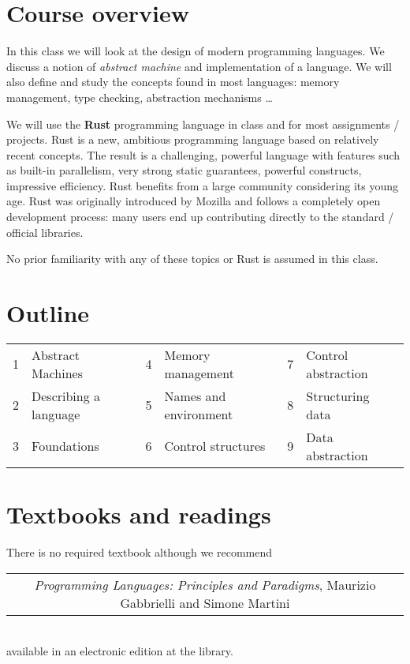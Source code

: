 \documentclass[10pt]{article}
\newcommand{\ita}[1]{\textit{#1}}
\begin{document}
\section*{Course overview}

In this class we will look at the design of modern programming languages. We
discuss a notion of \ita{abstract machine} and implementation of a language.
We will also define and study the concepts found in most languages: memory
management, type checking, abstraction mechanisms \ldots

We will use the \textbf{Rust} programming language in class and for most
assignments / projects. Rust is a new, ambitious programming language based on
relatively recent concepts. The result is a challenging, powerful language with
features such as built-in parallelism, very strong static guarantees, powerful
constructs, impressive efficiency. Rust benefits from a large community
considering its young age. Rust was originally introduced by Mozilla and
follows a completely open development process: many users end up contributing
directly to the standard / official libraries.\newline

No prior familiarity with any of these topics or Rust is assumed in this class.


\section*{Outline}

\begin{tabular}{c l | c l | c l}
  1 & Abstract Machines
    & 4 & Memory management
    & 7 & Control abstraction \\
  2 & Describing a language
    & 5 & Names and environment
    & 8 & Structuring data \\
  3 & Foundations
    & 6 & Control structures
    & 9 & Data abstraction \\
\end{tabular}


\section*{Textbooks and readings}

There is no required textbook although we recommend\\
\begin{tabular}{| c}
  \ita{Programming Languages: Principles and Paradigms},
  Maurizio Gabbrielli and Simone Martini
\end{tabular}\\
available in an electronic edition at the library.
\end{document}
